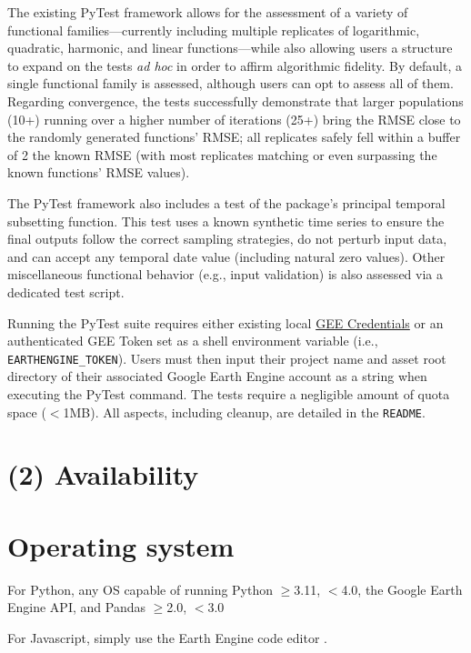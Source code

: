 \documentclass{jors}
\begin{document}
The existing PyTest framework allows for the assessment of a variety of functional families—currently including multiple replicates of logarithmic, quadratic, harmonic, and linear functions—while also allowing users a structure to expand on the tests \emph{ad hoc} in order to affirm algorithmic fidelity. By default, a single functional family is assessed, although users can opt to assess all of them. Regarding convergence, the tests successfully demonstrate that larger populations (10+) running over a higher number of iterations (25+) bring the RMSE close to the randomly generated functions' RMSE; all replicates safely fell within a buffer of 2\texttimes{} the known RMSE (with most replicates matching or even surpassing the known functions' RMSE values).

The PyTest framework also includes a test of the package's principal temporal subsetting function. This test uses a known synthetic time series to ensure the final outputs follow the correct sampling strategies, do not perturb input data, and can accept any temporal date value (including natural zero values). Other miscellaneous functional behavior (e.g., input validation) is also assessed via a dedicated test script.

Running the PyTest suite requires either existing local \href{https://developers.google.com/earth-engine/guides/auth}{GEE Credentials} or an authenticated GEE Token set as a shell environment variable (i.e., \texttt{EARTHENGINE\_TOKEN}). Users must then input their project name and asset root directory of their associated Google Earth Engine account as a string when executing the PyTest command. The tests require a negligible amount of quota space ($<$1MB). All aspects, including cleanup, are detailed in the \texttt{README}.

\section*{(2) Availability}
\vspace{0.5cm}
\section*{Operating system}

For Python, any OS capable of running Python $\geq$3.11, $<$4.0, the Google Earth Engine API, and Pandas $\geq$2.0, $<$3.0

For Javascript, simply use the Earth Engine code editor \cite{gorelick2017google}.
\end{document}
